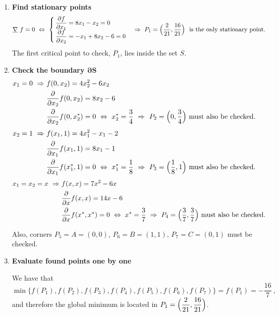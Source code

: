\documentclass[12pt,titlepage]{article}
\begin{document}
\begin{enumerate}
\item \textbf{Find stationary points}
\[
\underline{\nabla} \ f = 0 \ \Leftrightarrow \ \begin{cases} \dfrac{\partial f}{\partial x_1} = 8x_1 -x_2 = 0 \\ \dfrac{\partial f}{\partial x_2} = -x_1 +8x_2 -6 = 0 \end{cases} \Rightarrow \ P_1 = \Bigl(\dfrac{2}{21},\dfrac{16}{21}\Bigr) \ \ \text{is the only stationary point.}
\]
The first critical point to check, $P_1$, lies inside the set $S$.
\item \textbf{Check the boundary $\bm{\partial S}$}
\begin{align*}
x_1 = 0 \ \Rightarrow \ &f(0, x_2) = 4x_2^2 - 6x_2 \\
&\dfrac{\partial}{\partial x_2}f(0, x_2) = 8x_2 - 6 \\
&\dfrac{\partial}{\partial x_2}f(0, x_2^*) = 0 \ \Leftrightarrow \ x_2^* = \dfrac{3}{4} \ \Rightarrow \ P_2 = \Bigl(0, \dfrac{3}{4}\Bigr) \ \text{must also be checked.}
\end{align*}
\begin{align*}
x_2 = 1 \ \Rightarrow \ &f(x_1, 1) = 4x_1^2 - x_1 -2 \\
&\dfrac{\partial}{\partial x_1}f(x_1, 1) = 8x_1 - 1 \\
&\dfrac{\partial}{\partial x_1}f(x_1^*, 1) = 0 \ \Leftrightarrow \ x_1^* = \dfrac{1}{8} \ \Rightarrow \ P_3 = \Bigl(\dfrac{1}{8}, 1\Bigr) \ \text{must also be checked.}
\end{align*}
\begin{align*}
x_1 = x_2 = x \ \Rightarrow \ &f(x, x) = 7x^2 -6x \\
&\dfrac{\partial}{\partial x}f(x, x) = 14x-6 \\
&\dfrac{\partial}{\partial x}f(x^*, x^*) = 0 \ \Leftrightarrow \ x^* = \dfrac{3}{7} \ \Rightarrow \ P_4 = \Bigl(\dfrac{3}{7}, \dfrac{3}{7}\Bigr) \ \text{must also be checked.}
\end{align*}

Also, corners $P_5 = A = (0,0)$, $P_6 = B = (1,1)$, $P_7 = C = (0,1)$ must be checked.

\item \textbf{Evaluate found points one by one}

We have that 
\[
\min\big\lbrace f(P_1), f(P_2), f(P_3), f(P_4), f(P_5), f(P_6), f(P_7) \big\rbrace = f(P_1) = -\dfrac{16}{7} \ ,
\] 
and therefore the global minimum is located in $P_1 = \Bigl(\dfrac{2}{21},\dfrac{16}{21}\Bigr)$.
\end{enumerate}
\end{document}
